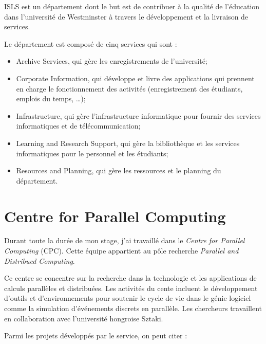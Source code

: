 ISLS est un d\'epartement dont le but est de contribuer \`a la qualit\'e de l'\'education dans l'universit\'e de Westminster \`a travers le d\'eveloppement et la livraison de services.

\noindent Le d\'epartement est compos\'e de cinq services qui sont :

\begin{itemize}
	\item Archive Services, qui g\`ere les enregistrements de l'universit\'e;
	\item Corporate Information, qui d\'eveloppe et livre des applications qui prennent en charge le fonctionnement des activit\'es (enregistrement des \'etudiants, emplois du temps, \ldots);
	\item Infrastructure, qui g\`ere l'infrastructure informatique pour fournir des services informatiques et de t\'el\'ecommunication;
	\item Learning and Research Support, qui g\`ere la biblioth\`eque et les services informatiques pour le personnel et les \'etudiants;
	\item Resources and Planning, qui g\`ere les ressources et le planning du d\'epartement.

\end{itemize}

\section{Centre for Parallel Computing}

Durant toute la dur\'ee de mon stage, j'ai travaill\'e dans le \textit{Centre for Parallel Computing} (CPC).
Cette \'equipe appartient au p\^ole recherche \textit{Parallel and Distribued Computing}.

Ce centre se concentre sur la recherche dans la technologie et les applications de calculs parall\`eles et distribu\'ees.
Les activit\'es du cente incluent le d\'eveloppement d'outils et d'environnements pour soutenir le cycle de vie dans le g\'enie logiciel comme la simulation d'\'ev\'enements discrets en parall\`ele.
Les chercheurs travaillent en collaboration avec l'universit\'e hongroise Sztaki.

\noindent Parmi les projets d\'evelopp\'es par le service, on peut citer :

